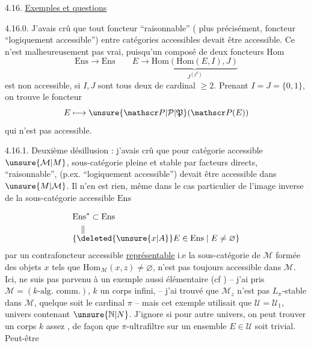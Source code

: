 4.16. \uline{Exemples et questions}

4.16.0. J'avais crû que tout foncteur ``raisonnable'' ( plus précisément,  foncteur ``logiquement accessible'') entre catégories accessibles devait être accessible. Ce n'est malheureusement pas vrai, puisqu'un composé de deux foncteurs Hom
\[
\mathrm{Ens}\longrightarrow\mathrm{Ens}\qquad
E\to\underbrace{\mathrm{Hom}(\mathrm{Hom}(E,I),J)}_{J^{(I^E)}}
\]
est non accessible, si $I,J$ sont tous deux de cardinal $\geq2$. Prenant  $I=J=\{0,1\}$, on trouve le foncteur
\[
E\longmapsto\unsure{\mathscr P|\mathcal P|\mathfrak P}(\mathscr P(E))
\]
qui n'est pas accessible.

4.16.1. Deuxième désillusion : j'avais crû que pour  catégorie accessible $\unsure{\mathcal M|M}$,  sous-catégorie   pleine et stable par facteurs directs,
``raisonnable'',  (p.ex. ``logiquement accessible'') devait être accessible dans $\unsure{M|\mathcal M}$. Il n'en est rien,  même dans le cas particulier de l'image inverse de la sous-catégorie accessible  $\mathrm{Ens}$

\[
\begin{aligned}
&\mathrm{Ens}^{*}\subset\mathrm{Ens}\\
&\quad\Vert\\[-1ex]
&\{\deleted{\unsure{x|A}}E\in\mathrm{Ens}\mid E\ne\varnothing\}
\end{aligned}
\]
par un contrafoncteur accessible \uline{représentable}
i.e la sous-catégorie  de $\mathcal M$ formée des objets $x$ tels que $\mathrm{Hom}_{\mathcal M}(x,z)\ne\varnothing$, n'est pas toujours accessible dans $\mathcal M$.
Ici,  ne suis pas parvenu à un exemple aussi élémentaire (cf ) -- j'ai
pris $\mathcal M=(k\text{-alg. comm.})$, $k$ un corps infini,  -- 
j'ai trouvé que $\mathcal M_z$ n'est pas  $L_\pi$-stable dans $\mathcal M$, quelque soit le cardinal $\pi$ -- mais cet exemple utilisait
que $\mathcal U=\mathcal U_1$,   univers contenant
$\unsure{\mathbb N|N}$.
 J'ignore si pour  autre univers,
on peut trouver un corps $k$  assez ,
de façon que   $\pi$-ultrafiltre sur un ensemble $E\in\mathcal U$ soit trivial. Peut-être

